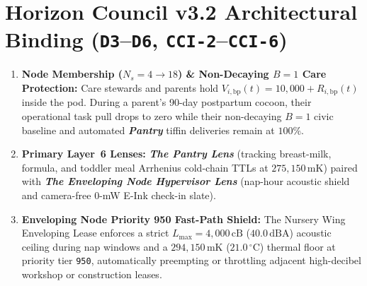 \section{Horizon Council v3.2 Architectural Binding (\texttt{D3}--\texttt{D6}, \texttt{CCI-2}--\texttt{CCI-6})}
\begin{enumerate}
    \item \textbf{Node Membership ($N_s = 4 \to 18$) \& Non-Decaying $B = 1$ Care Protection:} Care stewards and parents hold $V_{i,\mathrm{bp}}(t) = 10{,}000 + R_{i,\mathrm{bp}}(t)$ inside the pod. During a parent's 90-day postpartum cocoon, their operational task pull drops to zero while their non-decaying $B = 1$ civic baseline and automated \textbf{\textit{Pantry}} tiffin deliveries remain at $100\%$.
    \item \textbf{Primary Layer~6 Lenses:} \textbf{\textit{The Pantry Lens}} (tracking breast-milk, formula, and toddler meal Arrhenius cold-chain TTLs at $275{,}150\,\mathrm{mK}$) paired with \textbf{\textit{The Enveloping Node Hypervisor Lens}} (nap-hour acoustic shield and camera-free 0-mW E-Ink check-in slate).
    \item \textbf{Enveloping Node Priority 950 Fast-Path Shield:} The Nursery Wing Enveloping Lease enforces a strict $L_{\max} = 4{,}000\,\mathrm{cB}$ ($40.0\,\mathrm{dBA}$) acoustic ceiling during nap windows and a $294{,}150\,\mathrm{mK}$ ($21.0\,^\circ\mathrm{C}$) thermal floor at priority tier \texttt{950}, automatically preempting or throttling adjacent high-decibel workshop or construction leases.
\end{enumerate}

